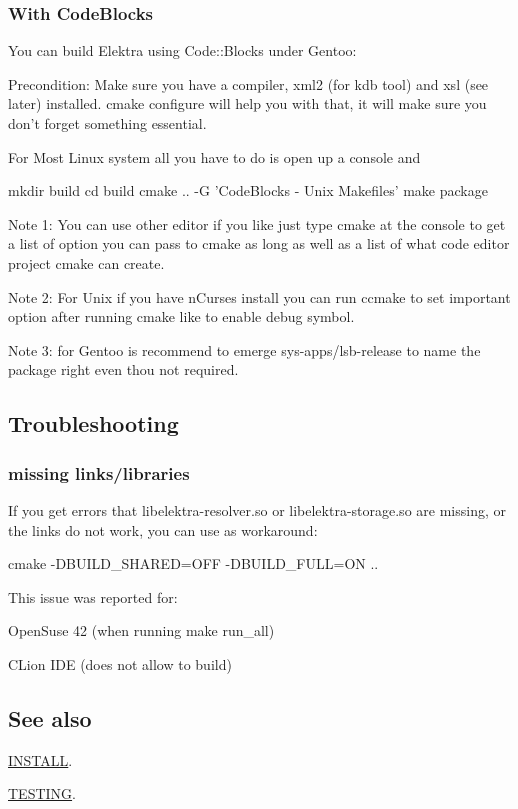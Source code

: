 \subsubsection*{With Code\+Blocks}

You can build Elektra using Code\+::\+Blocks under Gentoo\+:

Precondition\+: Make sure you have a compiler, xml2 (for kdb tool) and xsl (see later) installed. cmake configure will help you with that, it will make sure you don't forget something essential.

For Most Linux system all you have to do is open up a console and \begin{DoxyVerb}mkdir build
cd build
cmake .. -G 'CodeBlocks - Unix Makefiles'
make package
\end{DoxyVerb}


Note 1\+: You can use other editor if you like just type cmake at the console to get a list of option you can pass to cmake as long as well as a list of what code editor project cmake can create.

Note 2\+: For Unix if you have n\+Curses install you can run ccmake to set important option after running cmake like to enable debug symbol.

Note 3\+: for Gentoo is recommend to emerge sys-\/apps/lsb-\/release to name the package right even thou not required.

\subsection*{Troubleshooting}

\subsubsection*{missing links/libraries}

If you get errors that {\ttfamily libelektra-\/resolver.\+so} or {\ttfamily libelektra-\/storage.\+so} are missing, or the links do not work, you can use as workaround\+: \begin{DoxyVerb}    cmake -DBUILD_SHARED=OFF -DBUILD_FULL=ON ..
\end{DoxyVerb}


This issue was reported for\+:


\begin{DoxyItemize}
\item Open\+Suse 42 (when running {\ttfamily make run\+\_\+all})
\item C\+Lion I\+D\+E (does not allow to build)
\end{DoxyItemize}

\subsection*{See also}


\begin{DoxyItemize}
\item \hyperlink{doc_INSTALL_md}{I\+N\+S\+T\+A\+L\+L}.
\item \hyperlink{doc_TESTING_md}{T\+E\+S\+T\+I\+N\+G}. 
\end{DoxyItemize}